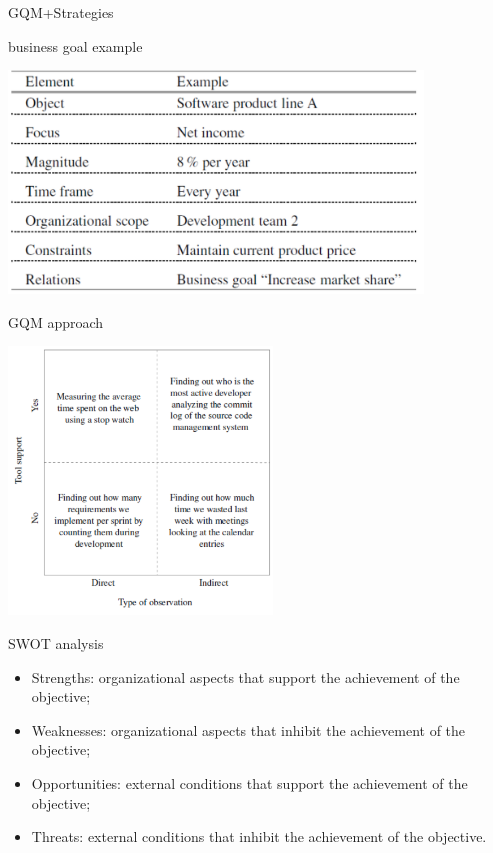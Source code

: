 \documentclass{beamer}
\begin{document}
\begin{frame}{\centerline{GQM+Strategies}}

\begin{center}
business goal example

\includegraphics[width=110mm]{A2022.IDSEPC.SperimentazioneDeduzione/image-06.png}
\end{center}

\end{frame}

\begin{frame}{\centerline{GQM approach}}


\begin{center}
\includegraphics[width=70mm]{A2022.IDSEPC.SperimentazioneDeduzione/image-01.png}
\end{center}
\end{frame}
\begin{frame}{\centerline{SWOT analysis}}

\begin{itemize}

\item  Strengths: organizational aspects that support the achievement of the objective;
\item  Weaknesses: organizational aspects that inhibit the achievement of the objective;
\item  Opportunities: external conditions that support the achievement of the objective;
\item  Threats: external conditions that inhibit the achievement of the objective.


\end{itemize}

\end{frame}
\end{document}
